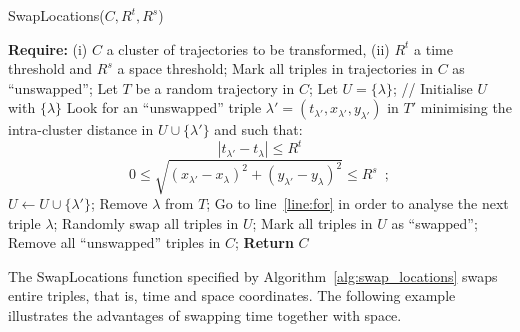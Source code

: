\begin{algorithm}[!ht]
\caption{SwapLocations($C, R^t, R^s$)} \label{alg:swap_locations}
\begin{algorithmic}[1]
\STATE \textbf{Require:} (i) $C$ a cluster of trajectories to be transformed, (ii) $R^t$ a time threshold and $R^s$ a space threshold;
\STATE Mark all triples in trajectories in $C$ as ``unswapped'';
\STATE Let $T$ be a random trajectory in $C$; \label{line:fewest}
 \label{line:for}
    \STATE Let $U = \{\lambda\}$;
// Initialise $U$ with $\{\lambda\}$
        \STATE Look for an ``unswapped''
	triple $\lambda'= (t_{\lambda'}, x_{\lambda'}, y_{\lambda'})$
	in $T'$ minimising the intra-cluster distance in $U \cup \{\lambda'\}$ and such that:
        \[ |t_{\lambda'} - t_{\lambda}| \leq R^t \]
        \[ 0 \leq \sqrt{(x_{\lambda'}-x_{\lambda})^2+(y_{\lambda'}-y_{\lambda})^2} \leq R^s \enspace ; \]
            \STATE $U \leftarrow U \cup \{\lambda'\}$;
        \ELSE
        	\STATE Remove $\lambda$ from $T$;
          \STATE Go to line~\ref{line:for} in order to analyse the next triple
	  $\lambda$;
        \ENDIF
    \ENDFOR
\STATE Randomly swap all triples in $U$;
    \STATE Mark all triples in $U$ as ``swapped'';
\ENDFOR
\STATE Remove all ``unswapped'' triples in $C$;
\STATE \textbf{Return}  $C$
\end{algorithmic}
\end{algorithm}

The SwapLocations function specified by
Algorithm~\ref{alg:swap_locations} swaps entire triples, that is,
time and space coordinates.
The following example illustrates the advantages of swapping
time together with space.

